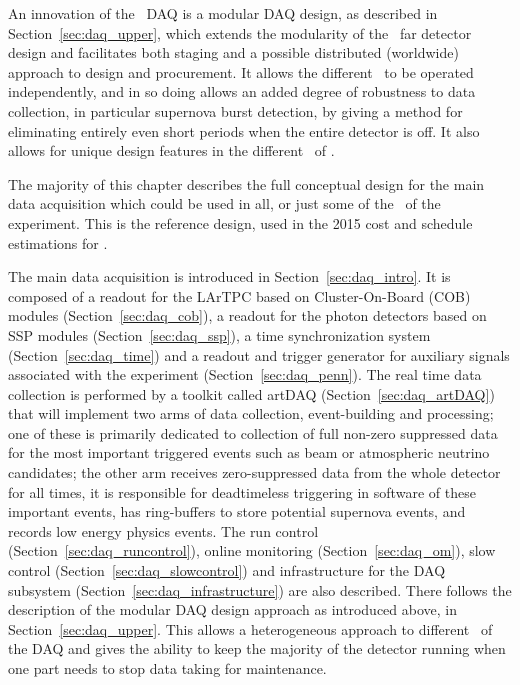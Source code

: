 An innovation of the \LBNE\ DAQ is a modular DAQ design,
as described in Section~\ref{sec:daq_upper}, which extends the
modularity of the \LBNE\ far detector design and facilitates both
staging and a possible distributed (worldwide) approach to design and
procurement.   It allows the different \COMPARTMENTS\ to be
operated independently, and in so doing allows an added degree of
robustness to data collection, in particular supernova burst
detection, by giving a method for eliminating entirely even short
periods when the entire detector is off.  It also allows for unique 
design features in the different \COMPARTMENTS\ 
of \LBNE.

The majority of this chapter describes the full conceptual design for
the main data acquisition which could be used in all, or just some of
the \COMPARTMENTS\ of the experiment.  This is the reference design,
used in the 2015 cost and schedule estimations for \LBNE.  


The main data acquisition is introduced in
Section~\ref{sec:daq_intro}.  It is composed of a readout for the
LArTPC based on Cluster-On-Board (COB) modules (Section~\ref{sec:daq_cob}), a readout for
the photon detectors based on SSP modules (Section~\ref{sec:daq_ssp}),
a time synchronization system (Section~\ref{sec:daq_time}) and a
readout and trigger generator for auxiliary signals associated with
the experiment (Section~\ref{sec:daq_penn}).  The real time data
collection is performed by a toolkit called artDAQ
(Section~\ref{sec:daq_artDAQ}) that will implement two arms of data
collection, event-building and processing; 
one of these is primarily dedicated to collection of full non-zero
suppressed data for the most important triggered events such as beam
or atmospheric neutrino candidates;  the other arm receives
zero-suppressed data from the whole detector for all times, it is responsible for
deadtimeless triggering in software of these important events, has ring-buffers to
store potential supernova events, and records low energy physics events.
The run control
(Section~\ref{sec:daq_runcontrol}), online monitoring
(Section~\ref{sec:daq_om}), slow control
(Section~\ref{sec:daq_slowcontrol}) and infrastructure for the DAQ
subsystem (Section~\ref{sec:daq_infrastructure}) are also described.
There follows the description of the modular DAQ design approach
as introduced above, in Section~\ref{sec:daq_upper}.  This allows a
heterogeneous approach to different \COMPARTMENTS\ of the DAQ and
gives the ability to keep the majority of the detector running when
one part needs to stop data taking for maintenance.

